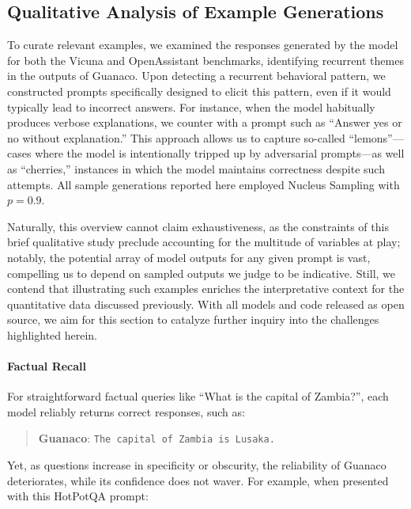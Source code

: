 \subsection{Qualitative Analysis of Example Generations}
\label{ssec:examples}

To curate relevant examples, we examined the responses generated by the model for both the Vicuna and OpenAssistant benchmarks, identifying recurrent themes in the outputs of {Guanaco}. Upon detecting a recurrent behavioral pattern, we constructed prompts specifically designed to elicit this pattern, even if it would typically lead to incorrect answers. For instance, when the model habitually produces verbose explanations, we counter with a prompt such as “Answer yes or no without explanation.” This approach allows us to capture so-called “lemons”—cases where the model is intentionally tripped up by adversarial prompts—as well as “cherries,” instances in which the model maintains correctness despite such attempts. All sample generations reported here employed Nucleus Sampling \cite{holtzmancurious} with $p=0.9$.

Naturally, this overview cannot claim exhaustiveness, as the constraints of this brief qualitative study preclude accounting for the multitude of variables at play; notably, the potential array of model outputs for any given prompt is vast, compelling us to depend on sampled outputs we judge to be indicative. Still, we contend that illustrating such examples enriches the interpretative context for the quantitative data discussed previously. With all models and code released as open source, we aim for this section to catalyze further inquiry into the challenges highlighted herein.

\paragraph{Factual Recall} For straightforward factual queries like ``What is the capital of Zambia?'', each model reliably returns correct responses, such as:

\begin{quote} 
    \textbf{Guanaco}:
    \texttt{The capital of Zambia is Lusaka.}
\end{quote}

Yet, as questions increase in specificity or obscurity, the reliability of {Guanaco} deteriorates, while its confidence does not waver. For example, when presented with this HotPotQA \citep{yang2018hotpotqa} prompt:


